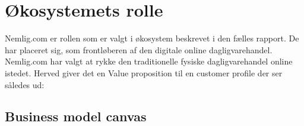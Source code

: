 \section{Økosystemets rolle}
Nemlig.com er rollen som er valgt i økosystem beskrevet i den fælles rapport. De har placeret sig, som frontløberen af den digitale online dagligvarehandel. Nemlig.com har valgt at rykke den traditionelle fysiske dagligvarehandel online istedet. Herved giver det en Value proposition til en customer profile der ser således ud:

\subsection{Business model canvas}

